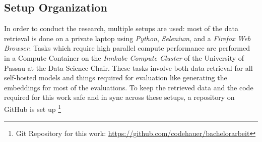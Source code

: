 \subsection{Setup Organization}

In order to conduct the research, multiple setups are used: most of the data retrieval is done on a private laptop using \textit{Python}, \textit{Selenium}, and a \textit{Firefox Web Browser}. Tasks which require high parallel compute performance are performed in a Compute Container on the \textit{Innkube Compute Cluster} of the University of Passau at the Data Science Chair. These tasks involve both data retrieval for all self-hosted models and things required for evaluation like generating the embeddings for most of the evaluations. To keep the retrieved data and the code required for this work safe and in sync across these setups, a repository on GitHub is set up \footnote{Git Repository for this work: \url{https://github.com/codehauer/bachelorarbeit}}